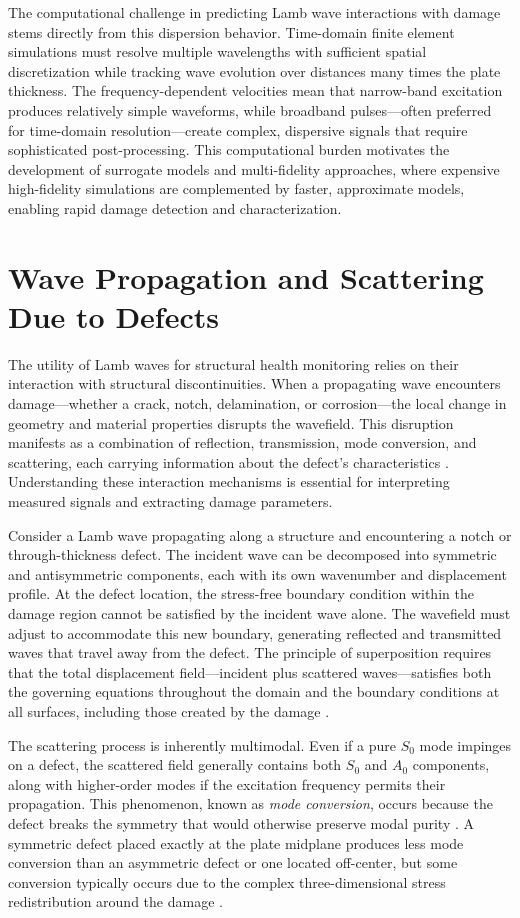 \documentclass[12pt,a4paper]{report}
\begin{document}
The computational challenge in predicting Lamb wave interactions with damage stems directly from this dispersion behavior. Time-domain finite element simulations must resolve multiple wavelengths with sufficient spatial discretization while tracking wave evolution over distances many times the plate thickness. The frequency-dependent velocities mean that narrow-band excitation produces relatively simple waveforms, while broadband pulses—often preferred for time-domain resolution—create complex, dispersive signals that require sophisticated post-processing. This computational burden motivates the development of surrogate models and multi-fidelity approaches, where expensive high-fidelity simulations are complemented by faster, approximate models, enabling rapid damage detection and characterization.

\section{Wave Propagation and Scattering Due to Defects}

The utility of Lamb waves for structural health monitoring relies on their interaction with structural discontinuities. When a propagating wave encounters damage—whether a crack, notch, delamination, or corrosion—the local change in geometry and material properties disrupts the wavefield. This disruption manifests as a combination of reflection, transmission, mode conversion, and scattering, each carrying information about the defect's characteristics \citep{rose2014ultrasonic,ahn2021lamb}. Understanding these interaction mechanisms is essential for interpreting measured signals and extracting damage parameters.

Consider a Lamb wave propagating along a structure and encountering a notch or through-thickness defect. The incident wave can be decomposed into symmetric and antisymmetric components, each with its own wavenumber and displacement profile. At the defect location, the stress-free boundary condition within the damage region cannot be satisfied by the incident wave alone. The wavefield must adjust to accommodate this new boundary, generating reflected and transmitted waves that travel away from the defect. The principle of superposition requires that the total displacement field—incident plus scattered waves—satisfies both the governing equations throughout the domain and the boundary conditions at all surfaces, including those created by the damage \citep{ahn2021lamb}.

The scattering process is inherently multimodal. Even if a pure $S_0$ mode impinges on a defect, the scattered field generally contains both $S_0$ and $A_0$ components, along with higher-order modes if the excitation frequency permits their propagation. This phenomenon, known as \textit{mode conversion}, occurs because the defect breaks the symmetry that would otherwise preserve modal purity \citep{ahn2021lamb}. A symmetric defect placed exactly at the plate midplane produces less mode conversion than an asymmetric defect or one located off-center, but some conversion typically occurs due to the complex three-dimensional stress redistribution around the damage \citep{cawley2018practical}.
\end{document}
